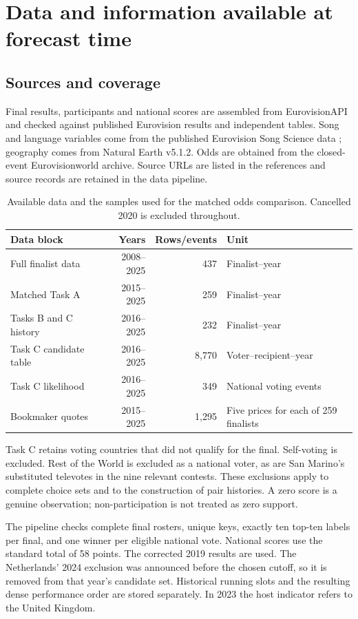 \documentclass[11pt,a4paper]{article}
\begin{document}
\section{Data and information available at forecast time}
\subsection{Sources and coverage}
Final results, participants and national scores are assembled from EurovisionAPI and checked against published Eurovision results and independent tables. Song and language variables come from the published Eurovision Song Science data \citep{adamska2025}; geography comes from Natural Earth v5.1.2. Odds are obtained from the closed-event Eurovisionworld archive. Source URLs are listed in the references and source records are retained in the data pipeline.

\begin{table}[H]\centering\small
\caption{Available data and the samples used for the matched odds comparison. Cancelled 2020 is excluded throughout.}\label{tab:data}
\begin{tabular}{lrrl}
\toprule
Data block & Years & Rows/events & Unit\\\midrule
Full finalist data & 2008--2025 & 437 & Finalist--year\\
Matched Task A & 2015--2025 & 259 & Finalist--year\\
Tasks B and C history & 2016--2025 & 232 & Finalist--year\\
Task C candidate table & 2016--2025 & 8,770 & Voter--recipient--year\\
Task C likelihood & 2016--2025 & 349 & National voting events\\
Bookmaker quotes & 2015--2025 & 1,295 & Five prices for each of 259 finalists\\\bottomrule
\end{tabular}
\end{table}

Task C retains voting countries that did not qualify for the final. Self-voting is excluded. Rest of the World is excluded as a national voter, as are San Marino's substituted televotes in the nine relevant contests. These exclusions apply to complete choice sets and to the construction of pair histories. A zero score is a genuine observation; non-participation is not treated as zero support.

The pipeline checks complete final rosters, unique keys, exactly ten top-ten labels per final, and one winner per eligible national vote. National scores use the standard total of 58 points. The corrected 2019 results are used. The Netherlands' 2024 exclusion was announced before the chosen cutoff, so it is removed from that year's candidate set. Historical running slots and the resulting dense performance order are stored separately. In 2023 the host indicator refers to the United Kingdom.
\end{document}
